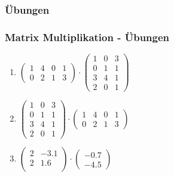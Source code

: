 \subsubsection{Übungen}
\begin{frame}
\frametitle{Matrix Multiplikation - Übungen}
\begin{enumerate}
\item $ \begin{pmatrix} 
1 & 4 & 0 & 1\\ 
0 & 2 & 1 & 3 
\end{pmatrix} 
\cdot 
\begin{pmatrix} 
1 & 0 & 3 \\ 
0 & 1 & 1\\
3 & 4 & 1\\
2 & 0 & 1
\end{pmatrix} $
\item 
$\begin{pmatrix} 
1 & 0 & 3 \\ 
0 & 1 & 1\\
3 & 4 & 1\\
2 & 0 & 1
\end{pmatrix} 
\cdot 
\begin{pmatrix} 
1 & 4 & 0 & 1\\ 
0 & 2 & 1 & 3 
\end{pmatrix} $
\item
$\begin{pmatrix}
2 & -3.1 \\
2 & 1.6 \\
\end{pmatrix}
\cdot
\begin{pmatrix}
-0.7 \\
-4.5 
\end{pmatrix}$
\end{enumerate}
\end{frame}

